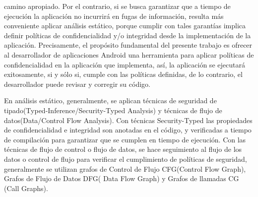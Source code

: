 camino apropiado. Por el contrario, si se busca garantizar que a tiempo de
ejecución la aplicación no incurrirá en fugas de información, resulta más
conveniente aplicar análisis estático, porque cumplir con tales garantías
implica definir políticas de confidencialidad y/o integridad desde la
implementación de la aplicación.\newline 
Precisamente, el propósito fundamental del presente trabajo es ofrecer al
desarrollador de aplicaciones Android una herramienta para aplicar políticas de
confidencialidad en la aplicación que implementa, así, la aplicación se
ejecutará exitosamente, si y sólo si, cumple con las políticas definidas, de lo
contrario, el desarrollador puede revisar y corregir su código.\newline
 
En análisis estático, generalmente, se aplican técnicas de seguridad de
tipado(Typed-Inference/Security-Typed Analysis) y técnicas de flujo de
datos(Data/Control Flow Analysis). Con técnicas Security-Typed las propiedades
de confidencialidad e integridad son anotadas en el código, y verificadas a
tiempo de compilación para garantizar que se cumplen en tiempo de ejecución. Con
las técnicas de flujo de control o flujo de datos, se hace seguimiento al flujo
de los datos o control de flujo para verificar el cumplimiento de políticas de
seguridad, generalmente se utilizan grafos de Control de Flujo CFG(Control Flow
Graph), Grafos de Flujo de Datos DFG( Data Flow Graph) y Grafos de llamadas CG
(Call Graphs).\newline 

